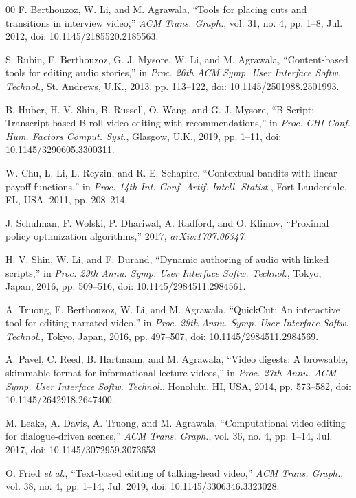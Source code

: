 \documentclass{ieeeaccess}
\begin{document}
\begin{thebibliography}{00}
 F. Berthouzoz, W. Li, and M. Agrawala, ``Tools for placing cuts and transitions in interview video,'' \emph{ACM Trans. Graph.}, vol. 31, no. 4, pp. 1--8, Jul. 2012, doi: 10.1145/2185520.2185563.

 S. Rubin, F. Berthouzoz, G. J. Mysore, W. Li, and M. Agrawala, ``Content-based tools for editing audio stories,'' in \emph{Proc. 26th ACM Symp. User Interface Softw. Technol.}, St. Andrews, U.K., 2013, pp. 113--122, doi: 10.1145/2501988.2501993.

 B. Huber, H. V. Shin, B. Russell, O. Wang, and G. J. Mysore, ``B-Script: Transcript-based B-roll video editing with recommendations,'' in \emph{Proc. CHI Conf. Hum. Factors Comput. Syst.}, Glasgow, U.K., 2019, pp. 1--11, doi: 10.1145/3290605.3300311.

 W. Chu, L. Li, L. Reyzin, and R. E. Schapire, ``Contextual bandits with linear payoff functions,'' in \emph{Proc. 14th Int. Conf. Artif. Intell. Statist.}, Fort Lauderdale, FL, USA, 2011, pp. 208--214.

 J. Schulman, F. Wolski, P. Dhariwal, A. Radford, and O. Klimov, ``Proximal policy optimization algorithms,'' 2017, \emph{arXiv:1707.06347}.

 H. V. Shin, W. Li, and F. Durand, ``Dynamic authoring of audio with linked scripts,'' in \emph{Proc. 29th Annu. Symp. User Interface Softw. Technol.}, Tokyo, Japan, 2016, pp. 509--516, doi: 10.1145/2984511.2984561.

 A. Truong, F. Berthouzoz, W. Li, and M. Agrawala, ``QuickCut: An interactive tool for editing narrated video,'' in \emph{Proc. 29th Annu. Symp. User Interface Softw. Technol.}, Tokyo, Japan, 2016, pp. 497--507, doi: 10.1145/2984511.2984569.

 A. Pavel, C. Reed, B. Hartmann, and M. Agrawala, ``Video digests: A browsable, skimmable format for informational lecture videos,'' in \emph{Proc. 27th Annu. ACM Symp. User Interface Softw. Technol.}, Honolulu, HI, USA, 2014, pp. 573--582, doi: 10.1145/2642918.2647400.

 M. Leake, A. Davis, A. Truong, and M. Agrawala, ``Computational video editing for dialogue-driven scenes,'' \emph{ACM Trans. Graph.}, vol. 36, no. 4, pp. 1--14, Jul. 2017, doi: 10.1145/3072959.3073653.

 O. Fried \emph{et al.}, ``Text-based editing of talking-head video,'' \emph{ACM Trans. Graph.}, vol. 38, no. 4, pp. 1--14, Jul. 2019, doi: 10.1145/3306346.3323028.


\end{thebibliography}
\end{document}
